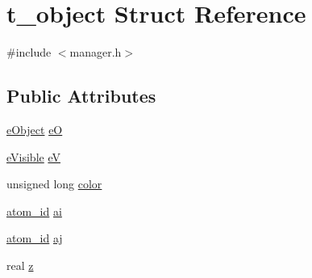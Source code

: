\hypertarget{structt__object}{\section{t\-\_\-object \-Struct \-Reference}
\label{structt__object}
}


{\ttfamily \#include $<$manager.\-h$>$}

\subsection*{\-Public \-Attributes}
\begin{DoxyCompactItemize}
\item 
\hyperlink{manager_8h_ad239e8ca5e4743e02612a9edf05a6cc7}{e\-Object} \hyperlink{structt__object_aeb73102728cf5ad8a4686c213c98f37e}{e\-O}
\item 
\hyperlink{manager_8h_a255380db9f6a6ae7af3d4838b9a5b192}{e\-Visible} \hyperlink{structt__object_a2103f5af08e19efddfc3abb5d1539b31}{e\-V}
\item 
unsigned long \hyperlink{structt__object_a7a2e1c430c16c0b7b1e7c696195c4d5c}{color}
\item 
\hyperlink{include_2types_2simple_8h_ad3f47cdb48677e516e2049719612c737}{atom\-\_\-id} \hyperlink{structt__object_acf24fac8afd483e0859437f68ad2ecc2}{ai}
\item 
\hyperlink{include_2types_2simple_8h_ad3f47cdb48677e516e2049719612c737}{atom\-\_\-id} \hyperlink{structt__object_a64c1e802eb2adb61ceb3dd98b88a6f87}{aj}
\item 
real \hyperlink{structt__object_a91268bf89ef8b574d4b613327fcf2016}{z}
\end{DoxyCompactItemize}


